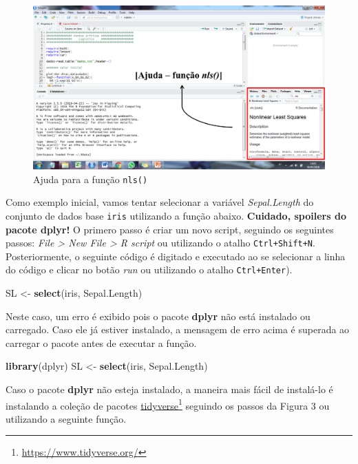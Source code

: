 \documentclass[
]{book}
\newenvironment{Shaded}{\begin{snugshade}}{\end{snugshade}}
\newcommand{\KeywordTok}[1]{\textcolor[rgb]{0.13,0.29,0.53}{\textbf{#1}}}
\newcommand{\NormalTok}[1]{#1}
\newcommand{\StringTok}[1]{\textcolor[rgb]{0.31,0.60,0.02}{#1}}
\begin{document}
\begin{figure}
\centering
\includegraphics{figures/Help.png}
\caption{Ajuda para a função \texttt{nls()}}
\end{figure}

Como exemplo inicial, vamos tentar selecionar a variável \emph{Sepal.Length} do conjunto de dados base \texttt{iris} utilizando a função abaixo. \textbf{Cuidado, spoilers do pacote dplyr!} O primero passo é criar um novo script, seguindo os seguintes passos: \emph{File \textgreater{} New File \textgreater{} R script} ou utilizando o atalho \texttt{Ctrl+Shift+N}. Posteriormente, o seguinte código é digitado e executado ao se selecionar a linha do código e clicar no botão \emph{run} ou utilizando o atalho \texttt{Ctrl+Enter}).

\begin{Shaded}
\begin{Highlighting}[]
\NormalTok{SL <-}\StringTok{ }\KeywordTok{select}\NormalTok{(iris, Sepal.Length)}
\end{Highlighting}
\end{Shaded}

Neste caso, um erro é exibido pois o pacote \textbf{dplyr} não está instalado ou carregado. Caso ele já estiver instalado, a mensagem de erro acima é superada ao carregar o pacote antes de executar a função.

\begin{Shaded}
\begin{Highlighting}[]
\KeywordTok{library}\NormalTok{(dplyr)}
\NormalTok{SL <-}\StringTok{ }\KeywordTok{select}\NormalTok{(iris, Sepal.Length)}
\end{Highlighting}
\end{Shaded}

Caso o pacote \textbf{dplyr} não esteja instalado, a maneira mais fácil de instalá-lo é instalando a coleção de pacotes \href{https://www.tidyverse.org/}{tidyverse}\footnote{\url{https://www.tidyverse.org/}} seguindo os passos da Figura 3 ou utilizando a seguinte função.
\end{document}
